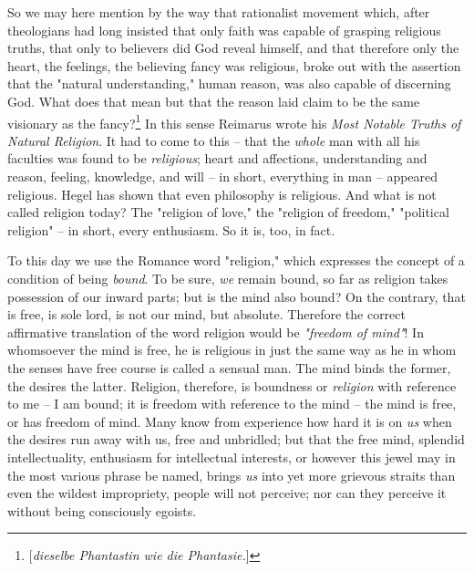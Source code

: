\documentclass[a4paper]{book}
\begin{document}
So we may here mention by the way that rationalist movement which, after 
theologians had long insisted that only faith was capable of grasping 
religious truths, that only to believers did God reveal himself, and that 
therefore only the heart, the feelings, the believing fancy was religious, 
broke out with the assertion that the "{}natural understanding,"{} human 
reason, was also capable of discerning God. What does that mean but that the 
reason laid claim to be the same visionary as the 
fancy?\footnote{[\textit{dieselbe Phantastin wie die Phantasie.}]} In this 
sense Reimarus wrote his \textit{Most Notable Truths of Natural Religion}. It 
had to come to this -- that the \textit{whole} man with all his faculties was 
found to be \textit{religious}; heart and affections, understanding and 
reason, feeling, knowledge, and will -- in short, everything in man -- 
appeared religious. Hegel has shown that even philosophy is religious. And 
what is not called religion today? The "{}religion of love,"{} the "{}religion 
of freedom,"{} "{}political religion"{} -- in short, every enthusiasm. So it 
is, too, in fact.

To this day we use the Romance word "{}religion,"{} which expresses the 
concept of a condition of being \textit{bound}. To be sure, \textit{we} remain 
bound, so far as religion takes possession of our inward parts; but is the 
mind also bound? On the contrary, that is free, is sole lord, is not our mind, 
but absolute. Therefore the correct affirmative translation of the word 
religion would be \textit{"{}freedom of mind"{}}! In whomsoever the mind is 
free, he is religious in just the same way as he in whom the senses have free 
course is called a sensual man. The mind binds the former, the desires the 
latter. Religion, therefore, is boundness or \textit{religion} with reference 
to me -- I am bound; it is freedom with reference to the mind -- the mind is 
free, or has freedom of mind. Many know from experience how hard it is on 
\textit{us} when the desires run away with us, free and unbridled; but that 
the free mind, splendid intellectuality, enthusiasm for intellectual 
interests, or however this jewel may in the most various phrase be named, 
brings \textit{us} into yet more grievous straits than even the wildest 
impropriety, people will not perceive; nor can they perceive it without being 
consciously egoists.
\end{document}
